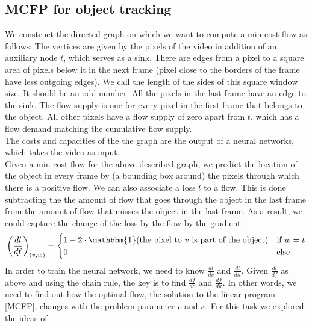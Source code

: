\documentclass{article}
\begin{document}
\subsection{MCFP for object tracking}\label{MCFP for tracking}
We construct the directed graph on which we want to compute a min-cost-flow as follows: The vertices are given by the pixels of the video in addition of an auxiliary node $t$, which serves as a sink. There are edges from a pixel to a square area of pixels below it in the next frame (pixel close to the borders of the frame have less outgoing edges). We call the length of the sides of this square window size. It should be an odd number. All the pixels in the last frame have an edge to the sink. The flow supply is one for every pixel in the first frame that belongs to the object. All other pixels have a flow supply of zero apart from $t$, which has a flow demand matching the cumulative flow supply.\\
The costs and capacities of the the graph are the output of a neural networks, which takes the video as input. \\
Given a min-cost-flow for the above described graph, we predict the location of the object in every frame by (a bounding box around) the pixels through which there is a positive flow. We can also associate a loss $l$ to a flow. This is done subtracting the the amount of flow that goes through the object in the last frame from the amount of flow that misses the object in the last frame. As a result, we could capture the change of the loss by the flow by the gradient:
\begin{align}\label{loss}
\left(\frac{dl}{df}\right)_{(v,w)} = 
\begin{cases}
 1-2\cdot\mathbbm{1}(\textnormal{the pixel to } v \textnormal{ is part of the object}) &\text{if } w = t\\
 0 &\text{else}
\end{cases}
\end{align}
In order to train the neural network, we need to know $\frac{dl}{dc}$ and $\frac{dl}{d\kappa}$. Given $\frac{dl}{df}$ as above and using the chain rule, the key is to find $\frac{df}{dc}$ and $\frac{df}{d\kappa}$. In other words, we need to find out how the optimal flow, the solution to the linear program \ref{MCFP}, changes with the problem parameter $c$ and $\kappa$. For this task we explored the ideas of \cite{AmosK17}
\end{document}
